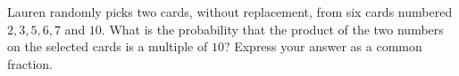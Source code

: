 Lauren randomly picks two cards, without replacement, from six cards numbered $2,3,5,6,7$ and $10$. What is the probability that the product of the two numbers on the selected cards is a multiple of $10$? Express your answer as a common fraction.
